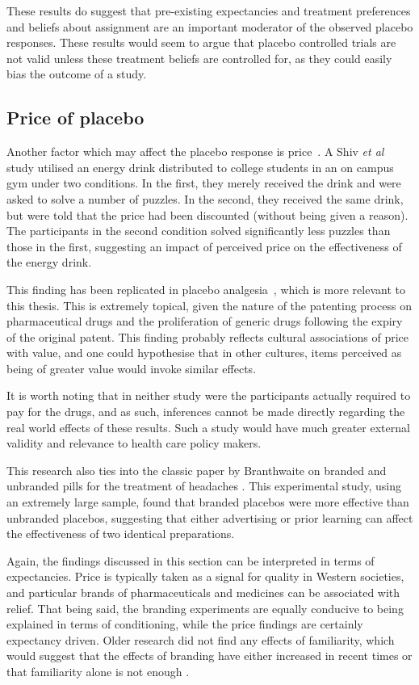 These results do suggest that pre-existing expectancies and treatment preferences and beliefs about assignment are an important moderator of the observed placebo responses. These results would seem to argue that placebo controlled trials are not valid unless these treatment beliefs are controlled for, as they could easily bias the outcome of a study. 

\subsection{Price of placebo}
\label{sec:price}

Another factor which may affect the placebo response is price~\cite{Shiv2005a}. A Shiv \textit{et al} study utilised an energy drink distributed to college students in an on campus gym under two conditions. In the first, they merely received the drink and were asked to solve a number of puzzles. In the second, they received the same drink, but were told that the price had been discounted (without being given a reason). The participants in the second condition solved significantly less puzzles than those in the first, suggesting an impact of perceived price on the effectiveness of the energy drink. 

This finding has been replicated in placebo analgesia~\cite{Waber2008}, which is more relevant to this thesis. This is extremely topical, given the nature of the patenting process on pharmaceutical drugs and the proliferation of generic drugs following the expiry of the original patent. This finding probably reflects cultural associations of price with value, and one could hypothesise that in other cultures, items perceived as being of greater value would invoke similar effects.  

It is worth noting that in neither study were the participants actually required to pay for the drugs, and as such, inferences cannot be made directly regarding the real world effects of these results. Such a study would have much greater external validity and relevance to health care policy makers. 

This research also ties into the classic paper by Branthwaite on branded and unbranded pills for the treatment of headaches \cite{Branthwaite1981}. This experimental study, using an extremely large sample, found that branded placebos were more effective than unbranded placebos, suggesting that either advertising or prior learning can affect the effectiveness of two identical preparations. 

Again, the findings discussed in this section can be interpreted in terms of  expectancies. Price is typically taken as a signal for quality in Western societies, and particular brands of pharmaceuticals and medicines can be associated with relief. That being said, the branding experiments are equally conducive to being explained in terms of conditioning, while the price findings are certainly expectancy driven. Older research did not find any effects of familiarity, which would suggest that the effects of branding have either increased  in recent times or that familiarity alone is not enough \cite{Morris1974}.  



